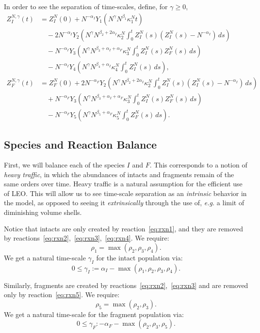 \documentclass{article}
\begin{document}
In order to see the separation of time-scales, define, for $\gamma \geq 0$, 
\begin{align*}
Z_I^{N, \gamma}(t)
&=Z_I^N(0)
+N^{-\alpha_I}
Y_1\!\left(N^\gamma
N^{\beta_1}\kappa_1^N t
\right) \\
&\quad
-2N^{-\alpha_I}
Y_2\!\left(N^\gamma
N^{\beta_2+2\alpha_I}\kappa_2^N
\int_0^t Z_I^N(s)
\left(Z_I^N(s)-N^{-\alpha_I}\right)\,ds
\right) \\
&\quad
-N^{-\alpha_I}
Y_3\!\left(N^\gamma
N^{\beta_3+\alpha_I+\alpha_F}\kappa_3^N
\int_0^t Z_I^N(s)Z_F^N(s)\,ds
\right) \\
&\quad
-N^{-\alpha_I}
Y_4\!\left(N^\gamma
N^{\beta_4+\alpha_I}\kappa_4^N
\int_0^t Z_I^N(s)\,ds
\right),
\\[1em]
Z_F^{N, \gamma}(t)
&=Z_F^N(0)
+2N^{-\alpha_F}
Y_2\!\left(N^\gamma
N^{\beta_2+2\alpha_I}\kappa_2^N
\int_0^t Z_I^N(s)
\left(Z_I^N(s)-N^{-\alpha_I}\right)\,ds
\right) \\
&\quad
+N^{-\alpha_F}
Y_3\!\left(N^\gamma
N^{\beta_3+\alpha_I+\alpha_F}\kappa_3^N
\int_0^t Z_I^N(s)Z_F^N(s)\,ds
\right) \\
&\quad
-N^{-\alpha_F}
Y_5\!\left(N^\gamma
N^{\beta_5+\alpha_F}\kappa_5^N
\int_0^t Z_F^N(s)\,ds
\right).
\end{align*}


\subsection{Species and Reaction Balance}
First, we will balance each of the species $I$ and $F$.
This corresponds to a notion of \emph{heavy traffic}, in which the abundances of intacts and fragments remain of the same orders over time.
Heavy traffic is a natural assumption for the efficient use of LEO.
This will allow us to see time-scale separation as an \emph{intrinsic} behavior in the model, as opposed to seeing it \emph{extrinsically} through the use of, \textit{e.g.} a limit of diminishing volume shells.

Notice that intacts are only created by reaction~\eqref{eq:rxn1}, and they are removed by reactions~\eqref{eq:rxn2},~\eqref{eq:rxn3},~\eqref{eq:rxn4}.
We require:
\[\rho_1 = \max(\rho_2, \rho_3, \rho_4).\]
We get a natural time-scale $\gamma_I$ for the intact population via:
\[0 \leq \gamma_I := \alpha_I - \max(\rho_1, \rho_2, \rho_3, \rho_4).\]

Similarly, fragments are created by reactions~\eqref{eq:rxn2},~\eqref{eq:rxn3} and are removed only by reaction~\eqref{eq:rxn5}.
We require:
\[\rho_5 = \max(\rho_2, \rho_3).\]
We get a natural time-scale for the fragment population via:
\[0 \leq \gamma_F :- \alpha_F - \max(\rho_2, \rho_3, \rho_5).\]
\end{document}
